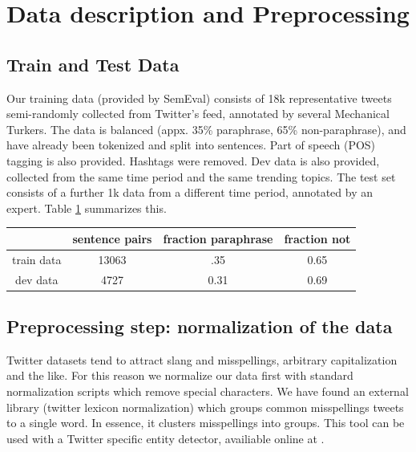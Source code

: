 \documentclass[conference]{IEEEtran}
\begin{document}
\section{Data description and Preprocessing}
\subsection {Train and Test Data} 
Our training data (provided by SemEval) consists of 18k representative tweets semi-randomly collected from Twitter's feed, annotated by several Mechanical Turkers.  The data is balanced (appx. 35\% paraphrase, 65\% non-paraphrase), and have already been tokenized and split into sentences.  Part of speech (POS) tagging is also provided. Hashtags were removed.  Dev data is also provided, collected from the same time period and the same trending topics. The test set  consists of a further 1k data from a different time period, annotated by an expert. Table \ref{dataset} summarizes this.

\begin{table}
\label{dataset}
\begin{tabular}{| c | c | c | c | }
\hline
 & sentence pairs & fraction paraphrase & fraction not \\ \hline
train data & 13063          & .35                 & 0.65                    \\ \hline
dev data  & 4727   & 0.31      & 0.69      \\ \hline
\end{tabular}
\end{table}

\subsection{Preprocessing step: normalization of the data}
Twitter datasets tend to attract slang and misspellings, arbitrary capitalization and the like.  For this reason we normalize our data first with standard normalization scripts which remove special characters.  We have found an external library (twitter lexicon normalization) which groups common misspellings tweets to a single word. In essence, it clusters misspellings into groups. This tool can be used with a Twitter specific entity detector, availiable online at \cite{twitter}.
\end{document}
